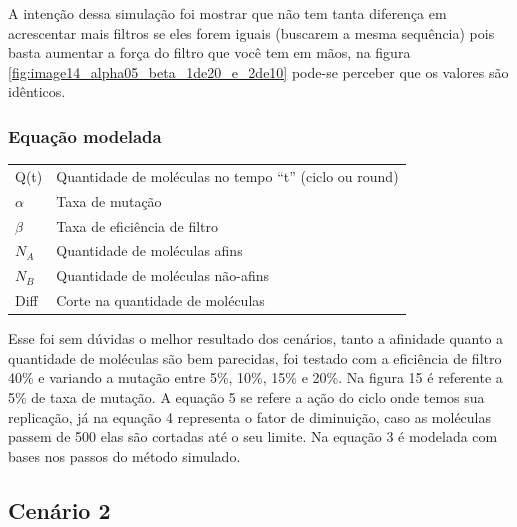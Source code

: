 A intenção dessa simulação foi mostrar que não tem tanta diferença em
acrescentar mais filtros se eles forem iguais (buscarem a mesma sequência) pois basta
aumentar a força do filtro que você tem em mãos, na figura \ref{fig:image14_alpha05_beta_1de20_e_2de10} pode-se perceber que os valores são idênticos. 

\subsubsection{Equação modelada}



\begin{flushleft}
\begin{tabular}{l|l}
Q(t)     & Quantidade de moléculas no tempo “t” (ciclo ou round) \\
$\alpha$ & Taxa de mutação\\
$\beta$  &Taxa de eficiência de filtro\\
$N_A$       & Quantidade de moléculas afins\\
$N_B$       & Quantidade de moléculas não-afins\\
Diff        & Corte na quantidade de moléculas\\
\end{tabular}
\end{flushleft}

\vspace{.5cm}



Esse foi sem dúvidas o melhor resultado dos cenários, tanto a afinidade quanto a
quantidade de moléculas são bem parecidas, foi testado com a eficiência de filtro 40\% e
variando a mutação entre 5\%, 10\%, 15\% e 20\%. Na figura 15 é referente a 5\% de taxa de
mutação. A equação 5 se refere a ação do ciclo onde temos sua replicação, já na equação
4 representa o fator de diminuição, caso as moléculas passem de 500 elas são cortadas até
o seu limite. Na equação 3 é modelada com bases nos passos do método simulado.

\subsection{Cenário 2}

